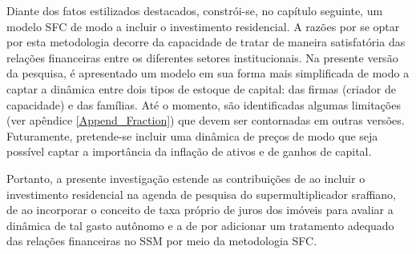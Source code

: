 
Diante dos fatos estilizados destacados, constrói-se, no capítulo seguinte, um modelo SFC de modo a incluir o investimento residencial. A razões por se optar por esta metodologia decorre da capacidade de tratar de maneira satisfatória das relações financeiras entre os diferentes setores institucionais. Na presente versão da pesquisa, é apresentado um modelo em sua forma mais simplificada de modo a captar a dinâmica entre dois tipos de estoque de capital: das firmas (criador de capacidade) e das famílias. Até o momento, são identificadas algumas limitações (ver apêndice \ref{Append_Fraction}) que devem ser contornadas em outras versões. Futuramente, pretende-se incluir uma dinâmica de preços de modo que seja possível captar a importância da inflação de ativos e de ganhos de capital. 


Portanto, a presente investigação estende as contribuições de \textcite{serrano_sraffian_1995} ao incluir o investimento residencial na agenda de pesquisa do supermultiplicador sraffiano, de \textcite{teixeira_crescimento_2015} ao incorporar o conceito de taxa próprio de juros dos imóveis para avaliar a dinâmica de tal gasto autônomo e a de \textcite{brochier_supermultiplier_2018} por adicionar um tratamento adequado das relações financeiras no SSM por meio da metodologia SFC.

